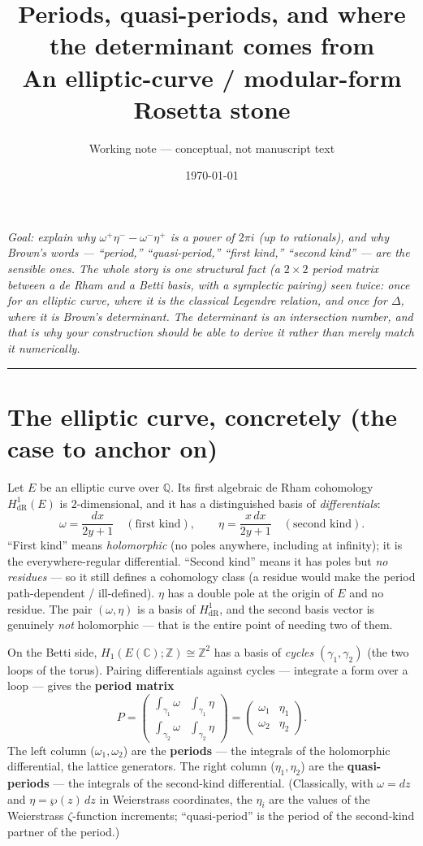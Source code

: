 \documentclass[11pt]{article}
\title{\bf Periods, quasi-periods, and where the determinant comes from\\[2pt]
\large An elliptic-curve / modular-form Rosetta stone}
\author{Working note --- conceptual, not manuscript text}
\date{\today}
\newcommand{\ZZ}{\mathbb{Z}}
\newcommand{\QQ}{\mathbb{Q}}
\newcommand{\CC}{\mathbb{C}}
\newcommand{\HdR}{H^1_{\mathrm{dR}}}
\begin{document}
\maketitle

\noindent\emph{Goal: explain why $\omega^+\eta^- - \omega^-\eta^+$ is a
power of $2\pi i$ (up to rationals), and why Brown's words --- ``period,''
``quasi-period,'' ``first kind,'' ``second kind'' --- are the sensible
ones. The whole story is one structural fact (a $2\times 2$ period matrix
between a de Rham and a Betti basis, with a symplectic pairing) seen
twice: once for an elliptic curve, where it is the classical Legendre
relation, and once for $\Delta$, where it is Brown's determinant. The
determinant is an intersection number, and that is why your construction
should be able to \emph{derive} it rather than merely match it
numerically.}

\bigskip\hrule\bigskip

\section{The elliptic curve, concretely (the case to anchor on)}

Let $E$ be an elliptic curve over $\QQ$. Its first algebraic de Rham
cohomology $\HdR(E)$ is $2$-dimensional, and it has a distinguished basis
of \emph{differentials}:
\[
  \omega = \frac{dx}{2y+1} \quad(\text{first kind}),
  \qquad
  \eta = \frac{x\,dx}{2y+1} \quad(\text{second kind}).
\]
``First kind'' means \emph{holomorphic} (no poles anywhere, including at
infinity); it is the everywhere-regular differential. ``Second kind''
means it has poles but \emph{no residues} --- so it still defines a
cohomology class (a residue would make the period path-dependent /
ill-defined). $\eta$ has a double pole at the origin of $E$ and no
residue. The pair $(\omega, \eta)$ is a basis of $\HdR$, and the second
basis vector is genuinely \emph{not} holomorphic --- that is the entire
point of needing two of them.

On the Betti side, $H_1(E(\CC); \ZZ) \cong \ZZ^2$ has a basis of
\emph{cycles} $(\gamma_1, \gamma_2)$ (the two loops of the torus). Pairing
differentials against cycles --- integrate a form over a loop --- gives
the \textbf{period matrix}
\[
  P = \begin{pmatrix}
    \int_{\gamma_1}\omega & \int_{\gamma_1}\eta \\[3pt]
    \int_{\gamma_2}\omega & \int_{\gamma_2}\eta
  \end{pmatrix}
  = \begin{pmatrix} \omega_1 & \eta_1 \\ \omega_2 & \eta_2 \end{pmatrix}.
\]
The left column ($\omega_1, \omega_2$) are the \textbf{periods} --- the
integrals of the holomorphic differential, the lattice generators. The
right column ($\eta_1, \eta_2$) are the \textbf{quasi-periods} --- the
integrals of the second-kind differential. (Classically, with
$\omega = dz$ and $\eta = \wp(z)\,dz$ in Weierstrass coordinates, the
$\eta_i$ are the values of the Weierstrass $\zeta$-function increments;
``quasi-period'' is the period of the second-kind partner of the period.)
\end{document}
